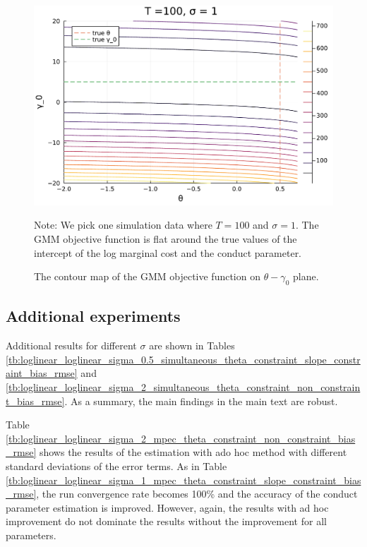 \documentclass[11pt, a4paper]{article}
\theoremstyle{remark}
\begin{document}
\begin{figure}
    \begin{center}
    \includegraphics[width=0.7\linewidth]{figuretable/contour_loglinear_loglinear_n_100_sigma_1.pdf}
    \caption{The contour map of the GMM objective function on $\theta - \gamma_0$ plane.}
    \label{fig:gmm_contour}    
    \end{center}
    \footnotesize
    Note: We pick one simulation data where $T = 100$ and $\sigma  =1$. The GMM objective function is flat around the true values of the intercept of the log marginal cost and the conduct parameter.
\end{figure}








\subsection{Additional experiments}\label{sec:additional_experiments}

Additional results for different $\sigma$ are shown in Tables \ref{tb:loglinear_loglinear_sigma_0.5_simultaneous_theta_constraint_slope_constraint_bias_rmse} and \ref{tb:loglinear_loglinear_sigma_2_simultaneous_theta_constraint_non_constraint_bias_rmse}. 
As a summary, the main findings in the main text are robust.
 
Table \ref{tb:loglinear_loglinear_sigma_2_mpec_theta_constraint_non_constraint_bias_rmse} shows the results of the estimation with ado hoc method with different standard deviations of the error terms.
As in Table \ref{tb:loglinear_loglinear_sigma_1_mpec_theta_constraint_slope_constraint_bias_rmse}, the run convergence rate becomes 100\% and the accuracy of the conduct parameter estimation is improved.
However, again, the results with ad hoc improvement do not dominate the results without the improvement for all parameters.
\end{document}
